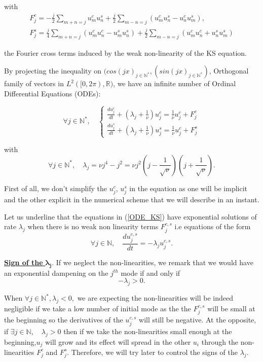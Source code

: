 \documentclass[12pt]{article}
\begin{document}
with 
\begin{align*}
F_j^c = -\frac{j}{2} \sum_{m+n=j}u_m^cu_n^s + \frac{j}{2} \sum_{m-n=j}(u_m^cu_n^s - u_n^cu_m^s), \\
F_j^s = \frac{j}{4} \sum_{m+n=j}(u_m^cu_n^c - u_m^su_n^s)+ \frac{j}{2} \sum_{m-n=j}(u_m^cu_n^c + u_n^su_m^s)
\end{align*}

the Fourier cross terms induced by the weak non-linearity of the KS equation. 

By projecting the inequality on $(cos(jx)_{j\in \mathbb{N}^*}, (sin(jx)_{j \in \mathbb{N}^*})$,  Orthogonal family of vectors in $L^2([0,2\pi), \mathbb{R})$, we have an infinite number of Ordinal Differential Equations (ODEs): 

\begin{equation}\label{ODE_KS}
    \forall j \in \mathbb{N}^*,\quad 
    \left\{
    \begin{aligned}
        \frac{du_j^c}{dt} + (\lambda_j + \frac{1}{\nu})u_j^c = \frac{1}{\nu}u_j^c + F_j^c \\
        \frac{du_j^s}{dt} + (\lambda_j + \frac{1}{\nu})u_j^s = \frac{1}{\nu}u_j^c + F_j^s
    \end{aligned}
    \right.
\end{equation}

with 
\begin{equation}
    \forall j\in \mathbb{N}^*, \quad \lambda_j = \nu j^4 - j^2 = \nu j^2(j-\frac{1}{\sqrt{\nu}})(j+\frac{1}{\sqrt{\nu}}).
\end{equation}

 First of all, we don't simplify the $u_j^c$, $u_j^s$ in the equation as one will be implicit and the other explicit in the numerical scheme that we will describe in an instant. 

Let us underline that the equations in (\ref{ODE_KS}) have exponential solutions of rate $\lambda_j$ when there is no weak non linearity terms $F_j^{c,s}$ i.e equations of the form \begin{equation}\label{KS_exponential_ODE}
    \forall j\in \mathbb{N}, \quad \frac{du_j^{c,s}}{dt} = -\lambda_ju_j^{c,s}.
\end{equation}

\underline{\textbf{Sign of the } $\boldsymbol{\lambda_j}.$} If we neglect the non-linearities, we remark that we would have an exponential dampening on the $j^{th}$ mode if and only if $$-\lambda_j > 0. $$

When $\forall j \in \mathbb{N}^*,\lambda_j <0,$ we are expecting the non-linearities will be indeed negligible if we take a low number of initial mode as the the $F_j^{c,s}$ will be small at the beginning so the derivatives of the $u_j^{c,s}$ will still be negative. 
At the opposite, if $\exists j \in \mathbb{N}, \quad \lambda_j >0$ then if we take the non-linearities small enough at the beginning,$u_j$ will grow and its effect will spread in the other $u_i$ through the non-linearities $F_j^c$ and $F_j^s$. Therefore, we will try later to control the signs of the $\lambda_j$.
\end{document}

